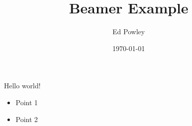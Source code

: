 \documentclass{beamer}
\title{Beamer Example}
\author{Ed Powley}
\date{\today}
\begin{document}
\maketitle

\begin{frame}{Hello world!}
	\begin{itemize}
		\item Point 1 \pause
		\item Point 2
	\end{itemize}
\end{frame}
\end{document}
